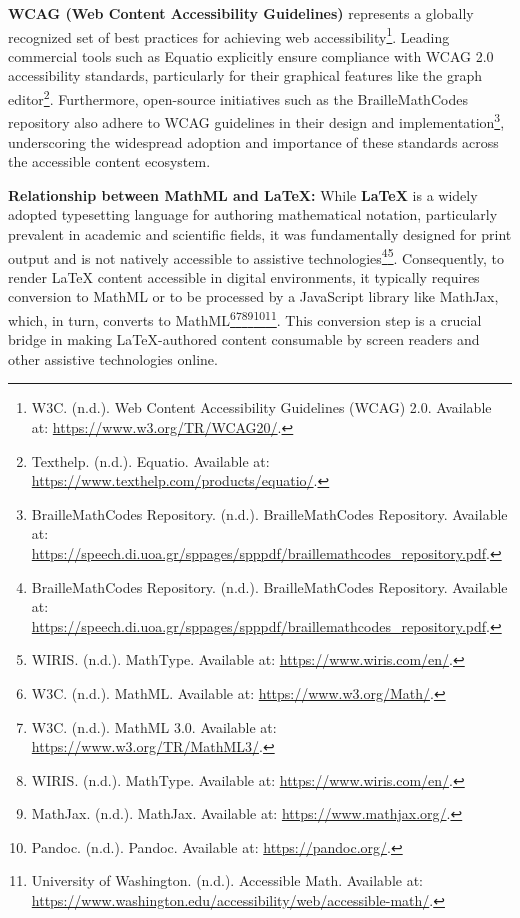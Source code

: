 \textbf{WCAG (Web Content Accessibility Guidelines)} represents a globally recognized set of best practices for achieving web accessibility\footnote{W3C. (n.d.). Web Content Accessibility Guidelines (WCAG) 2.0. Available at: \url{https://www.w3.org/TR/WCAG20/}.}. Leading commercial tools such as Equatio explicitly ensure compliance with WCAG 2.0 accessibility standards, particularly for their graphical features like the graph editor\footnote{Texthelp. (n.d.). Equatio. Available at: \url{https://www.texthelp.com/products/equatio/}.}. Furthermore, open-source initiatives such as the BrailleMathCodes repository also adhere to WCAG guidelines in their design and implementation\footnote{BrailleMathCodes Repository. (n.d.). BrailleMathCodes Repository. Available at: \url{https://speech.di.uoa.gr/sppages/spppdf/braillemathcodes_repository.pdf}.}, underscoring the widespread adoption and importance of these standards across the accessible content ecosystem.

\textbf{Relationship between MathML and LaTeX:} While \textbf{LaTeX} is a widely adopted typesetting language for authoring mathematical notation, particularly prevalent in academic and scientific fields, it was fundamentally designed for print output and is not natively accessible to assistive technologies\footnote{BrailleMathCodes Repository. (n.d.). BrailleMathCodes Repository. Available at: \url{https://speech.di.uoa.gr/sppages/spppdf/braillemathcodes_repository.pdf}.}\footnote{WIRIS. (n.d.). MathType. Available at: \url{https://www.wiris.com/en/}.}. Consequently, to render LaTeX content accessible in digital environments, it typically requires conversion to MathML or to be processed by a JavaScript library like MathJax, which, in turn, converts to MathML\footnote{W3C. (n.d.). MathML. Available at: \url{https://www.w3.org/Math/}.}\footnote{W3C. (n.d.). MathML 3.0. Available at: \url{https://www.w3.org/TR/MathML3/}.}\footnote{WIRIS. (n.d.). MathType. Available at: \url{https://www.wiris.com/en/}.}\footnote{MathJax. (n.d.). MathJax. Available at: \url{https://www.mathjax.org/}.}\footnote{Pandoc. (n.d.). Pandoc. Available at: \url{https://pandoc.org/}.}\footnote{University of Washington. (n.d.). Accessible Math. Available at: \url{https://www.washington.edu/accessibility/web/accessible-math/}.}. This conversion step is a crucial bridge in making LaTeX-authored content consumable by screen readers and other assistive technologies online.

